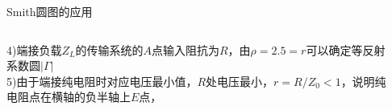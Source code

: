 \begin{frame}{Smith圆图的应用}
  \begin{columns}
    \begin{column}{0.4\linewidth}
      4)\quad 端接负载$Z_L$的传输系统的$A$点输入阻抗为$R$，由$\rho=2.5=r$可以确定等反射系数圆$\lvert\Gamma\rvert$\\
      5)\quad 由于端接纯电阻时对应电压最小值，$R$处电压最小，$r=R/Z_0<1$，说明纯电阻点在横轴的负半轴上$E$点，
    \end{column}
    \begin{column}{0.6\linewidth}

\end{column}
\end{columns}
\end{frame}
